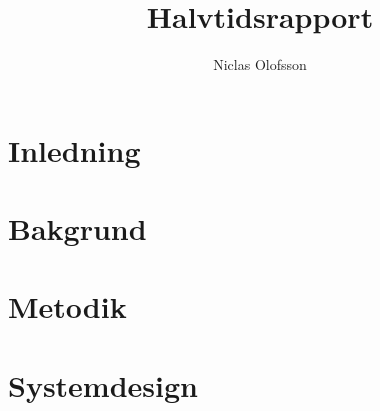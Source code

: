 \documentclass[a4paper]{article}
\author{Niclas Olofsson}
\title{Halvtidsrapport}
\begin{document}
\maketitle

\section{Inledning}


\section{Bakgrund}


\section{Metodik}


\section{Systemdesign}



%
\end{document}
